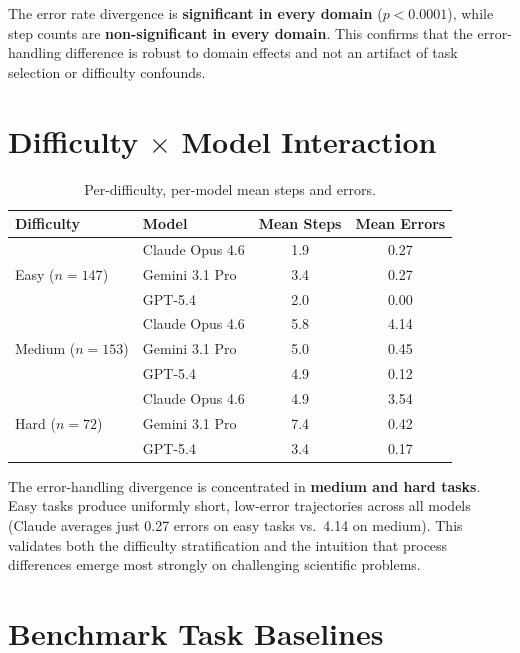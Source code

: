 \documentclass{article}
\begin{document}
The error rate divergence is \textbf{significant in every domain} ($p{<}0.0001$), while step counts are \textbf{non-significant in every domain}. This confirms that the error-handling difference is robust to domain effects and not an artifact of task selection or difficulty confounds.

\section{Difficulty $\times$ Model Interaction}
\label{app:difficulty}

\begin{table}[h]
\caption{Per-difficulty, per-model mean steps and errors.}
\label{tab:difficulty}
\centering\small
\begin{tabular}{llcc}
\toprule
\textbf{Difficulty} & \textbf{Model} & \textbf{Mean Steps} & \textbf{Mean Errors} \\
\midrule
\multirow{3}{*}{Easy ($n{=}147$)} & Claude Opus 4.6 & 1.9 & 0.27 \\
& Gemini 3.1 Pro & 3.4 & 0.27 \\
& GPT-5.4 & 2.0 & 0.00 \\
\midrule
\multirow{3}{*}{Medium ($n{=}153$)} & Claude Opus 4.6 & 5.8 & 4.14 \\
& Gemini 3.1 Pro & 5.0 & 0.45 \\
& GPT-5.4 & 4.9 & 0.12 \\
\midrule
\multirow{3}{*}{Hard ($n{=}72$)} & Claude Opus 4.6 & 4.9 & 3.54 \\
& Gemini 3.1 Pro & 7.4 & 0.42 \\
& GPT-5.4 & 3.4 & 0.17 \\
\bottomrule
\end{tabular}
\end{table}

The error-handling divergence is concentrated in \textbf{medium and hard tasks}. Easy tasks produce uniformly short, low-error trajectories across all models (Claude averages just 0.27 errors on easy tasks vs.\ 4.14 on medium). This validates both the difficulty stratification and the intuition that process differences emerge most strongly on challenging scientific problems.

\section{Benchmark Task Baselines}
\label{app:baselines}
\end{document}
